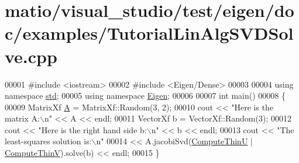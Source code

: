 \hypertarget{matio_2visual__studio_2test_2eigen_2doc_2examples_2_tutorial_lin_alg_s_v_d_solve_8cpp_source}{}\section{matio/visual\+\_\+studio/test/eigen/doc/examples/\+Tutorial\+Lin\+Alg\+S\+V\+D\+Solve.cpp}
\label{matio_2visual__studio_2test_2eigen_2doc_2examples_2_tutorial_lin_alg_s_v_d_solve_8cpp_source}

\begin{DoxyCode}
00001 \textcolor{preprocessor}{#include <iostream>}
00002 \textcolor{preprocessor}{#include <Eigen/Dense>}
00003 
00004 \textcolor{keyword}{using namespace }\hyperlink{namespacestd}{std};
00005 \textcolor{keyword}{using namespace }\hyperlink{namespace_eigen}{Eigen};
00006 
00007 \textcolor{keywordtype}{int} main()
00008 \{
00009    MatrixXf \hyperlink{group___core___module_class_eigen_1_1_matrix}{A} = MatrixXf::Random(3, 2);
00010    cout << \textcolor{stringliteral}{"Here is the matrix A:\(\backslash\)n"} << A << endl;
00011    VectorXf b = VectorXf::Random(3);
00012    cout << \textcolor{stringliteral}{"Here is the right hand side b:\(\backslash\)n"} << b << endl;
00013    cout << \textcolor{stringliteral}{"The least-squares solution is:\(\backslash\)n"}
00014         << A.jacobiSvd(\hyperlink{group__enums_ggae3e239fb70022eb8747994cf5d68b4a9af8c742a1aa87773e165eae406c9ccaf8}{ComputeThinU} | \hyperlink{group__enums_ggae3e239fb70022eb8747994cf5d68b4a9a1055e53fa95c8ae04a07ebb72cfafd95}{ComputeThinV}).solve(b) << endl;
00015 \}
\end{DoxyCode}

